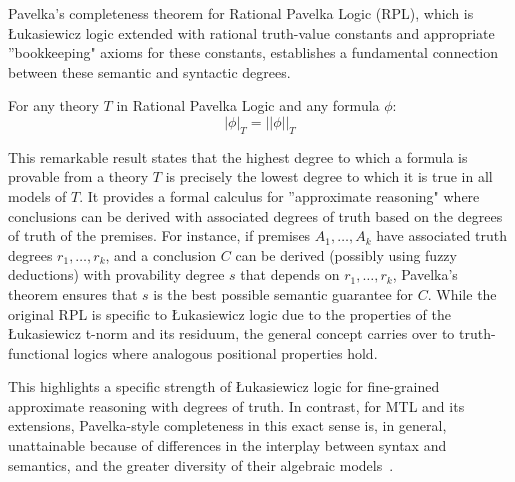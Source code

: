 Pavelka's completeness theorem for Rational Pavelka Logic (RPL), which is Łukasiewicz logic extended with rational truth-value constants and appropriate ''bookkeeping" axioms for these constants, establishes a fundamental connection between these semantic and syntactic degrees.

\begin{theorem}
For any theory $T$ in Rational Pavelka Logic and any formula $\phi$:
\[
 |\phi|_T = ||\phi||_T 
\]
\end{theorem}

This remarkable result states that the highest degree to which a formula is provable from a theory $T$ is precisely the lowest degree to which it is true in all models of $T$. It provides a formal calculus for ''approximate reasoning" where conclusions can be derived with associated degrees of truth based on the degrees of truth of the premises. For instance, if premises $A_1, \ldots, A_k$ have associated truth degrees $r_1, \ldots, r_k$, and a conclusion $C$ can be derived (possibly using fuzzy deductions) with provability degree $s$ that depends on $r_1, \ldots, r_k$, Pavelka's theorem ensures that $s$ is the best possible semantic guarantee for $C$. While the original RPL is specific to Łukasiewicz logic due to the properties of the Łukasiewicz t-norm and its residuum, the general concept carries over to truth-functional logics where analogous positional properties hold.

This highlights a specific strength of Łukasiewicz logic for fine-grained approximate reasoning with degrees of truth. In contrast, for MTL and its extensions, Pavelka-style completeness in this exact sense is, in general, unattainable because of differences in the interplay between syntax and semantics, and the greater diversity of their algebraic models~\cite[Rem. 4.1.22, Rem. 4.2.22]{Hajek1998}.
